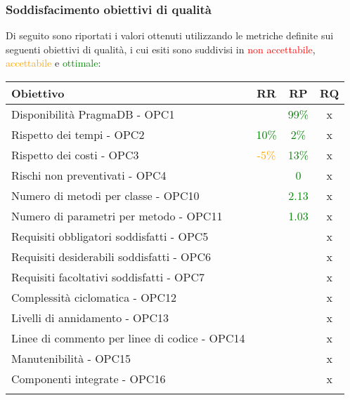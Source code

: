 \documentclass[PdQ.tex]{subfiles}
\begin{document}
\subsubsection{Soddisfacimento obiettivi di qualità}
			Di seguito sono riportati i valori ottenuti utilizzando le metriche definite sui seguenti obiettivi di qualità, i cui esiti sono suddivisi in \textcolor{red}{non accettabile}, \textcolor{orange}{accettabile} e \textcolor{green}{ottimale}:
			\begin{table}[h]
				\centering
				\begin{tabular}{l c c c}
					\hline
					\rule[-0.3cm]{0cm}{0.8cm}
					\textbf{Obiettivo} & \textbf{RR} & \textbf{RP} & \textbf{RQ}\\
					\hline
					\rule[0cm]{0cm}{0.4cm}
					Disponibilità PragmaDB - OPC1 & & \textcolor{green}{99\%} & x \\
					\rule[0cm]{0cm}{0.4cm}
					Rispetto dei tempi - OPC2 & \textcolor{green}{10\%} & \textcolor{green}{2\%} & x \\
					\rule[0cm]{0cm}{0.4cm}
					Rispetto dei costi - OPC3 & \textcolor{orange}{-5\%} & \textcolor{green}{13\%} & x\\
					\rule[0cm]{0cm}{0.4cm}
					Rischi non preventivati - OPC4 & & \textcolor{green}{0} & x\\
					\rule[0cm]{0cm}{0.4cm}
					Numero di metodi per classe - OPC10 & & \textcolor{green}{2.13} & x\\
					\rule[0cm]{0cm}{0.4cm}
					Numero di parametri per metodo - OPC11 & & \textcolor{green}{1.03} & x\\
					\rule[0cm]{0cm}{0.4cm}
					Requisiti obbligatori soddisfatti - OPC5 & & & x \\
					\rule[0cm]{0cm}{0.4cm}
					Requisiti desiderabili soddisfatti - OPC6 & & & x \\
					\rule[0cm]{0cm}{0.4cm}
					Requisiti facoltativi soddisfatti - OPC7 & & & x \\
					\rule[0cm]{0cm}{0.4cm}
					Complessità ciclomatica - OPC12 & & & x \\
					\rule[0cm]{0cm}{0.4cm}
					Livelli di annidamento - OPC13 & & & x \\
					\rule[0cm]{0cm}{0.4cm}
					Linee di commento per linee di codice - OPC14 & & & x \\
					\rule[0cm]{0cm}{0.4cm}
					Manutenibilità - OPC15 & & & x \\
					\rule[0cm]{0cm}{0.4cm}
					Componenti integrate - OPC16 & & & x \\
					\rule[0cm]{0cm}{0.4cm}

\end{tabular}
\end{table}
\end{document}

